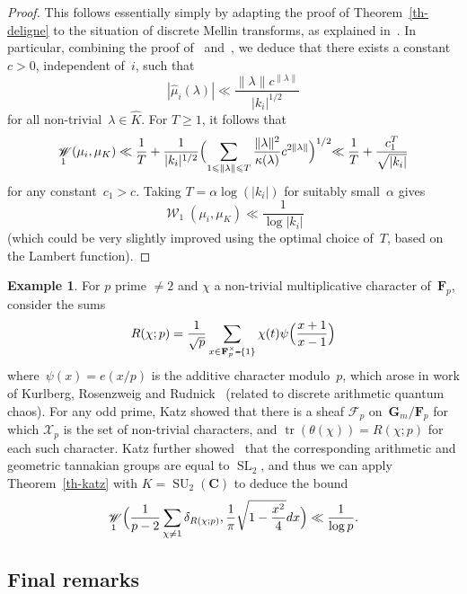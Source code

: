 \documentclass[12pt]{amsart}
\renewcommand{\mathcal}{\mathscr}
\def\setminus{\mathchoice
	{\mathbin{\vrule height .62ex width 1.61ex depth -.38ex}}%
	{\mathbin{\vrule height .62ex width 1.61ex depth -.38ex}}%
	{\mathbin{\vrule height .50ex width 0.85ex depth -.28ex}}%
	{\mathbin{\vrule height .20ex width 0.570ex depth -.24ex}}%
}
\renewcommand{\leq}{\leqslant}
\renewcommand{\geq}{\geqslant}
\newcommand{\Cc}{\mathbf{C}}
\newcommand{\Gg}{\mathbf{G}}
\newcommand{\Ff}{\mathbf{F}}
\DeclareMathOperator{\wass}{\mathcal{W}}
\DeclareMathOperator{\Tr}{tr}
\DeclareMathOperator{\SL}{SL}
\DeclareMathOperator{\SU}{SU}
\theoremstyle{plain}
\theoremstyle{remark}
\theoremstyle{definition}
\newtheorem{example}[theorem]{Example}
\renewcommand{\geq}{\geqslant}
\renewcommand{\leq}{\leqslant}
\begin{document}
\begin{proof}
  This follows essentially simply by adapting the proof of
  Theorem~\ref{th-deligne} to the situation of discrete Mellin
  transforms, as explained in~\cite[Ch.\,28]{mellin}. In particular,
  combining the proof of~\cite[Th.\,28.1]{mellin}
  and~\cite[Prop.\,6.36]{sffk}, we deduce that there exists a
  constant~$c>0$, independent of~$i$, such that
  \[
    |\widehat{\mu}_i(\lambda)|\ll
    \frac{\|\lambda\|c^{\|\lambda\|}}{|k_i|^{1/2}}
  \]
  for all non-trivial~$\lambda\in\widehat{K}$. For $T\geq 1$, it
  follows that
  \[
    \wass_1(\mu_i,\mu_K)\ll \frac{1}{T}+ \frac{1}{|k_i|^{1/2}}\Bigl(
    \sum_{1\leq \|\lambda\|\leq
      T}\frac{\|\lambda\|^2}{\kappa(\lambda)}c^{2\|\lambda\|}\Bigl)^{1/2}
    \ll \frac{1}{T}+\frac{c_1^{T}}{\sqrt{|k_i|}}
  \]
  for any constant~$c_1>c$. Taking $T=\alpha\log(|k_i|)$ for suitably
  small~$\alpha$ gives
  \[
    \wass_1(\mu_i,\mu_K)\ll \frac{1}{\log|k_i|}
  \]
  (which could be very slightly improved using the optimal choice
  of~$T$, based on the Lambert function).
\end{proof}


\begin{example}
  For $p$ prime $\not=2$ and $\chi$ a non-trivial multiplicative
  character of~$\Ff_p$, consider the sums
  \[
    R(\chi;p)=\frac{1}{\sqrt{p}}\sum_{x\in
      \Ff_p^{\times}\setminus\{1\}}
    \chi(t)\psi\Bigl(\frac{x+1}{x-1}\Bigr)
  \]
  where~$\psi(x)=e(x/p)$ is the additive character modulo~$p$, which
  arose in work of Kurlberg, Rosenzweig and Rudnick~\cite{krr}
  (related to discrete arithmetic quantum chaos). For any odd prime,
  Katz showed that there is a sheaf $\mathcal{F}_p$ on~$\Gg_m/\Ff_p$
  for which $\mathcal{X}_p$ is the set of non-trivial characters, and
  $\Tr(\theta(\chi))=R(\chi;p)$ for each such character. Katz further
  showed~\cite[Th.\,14.5]{mellin} that the corresponding arithmetic
  and geometric tannakian groups are equal to $\SL_2$, and thus we can
  apply Theorem~\ref{th-katz} with $K=\SU_2(\Cc)$ to deduce the bound
  \[
    \wass_1\Bigl(\frac{1}{p-2}\sum_{\chi\not=1}
    \delta_{R(\chi;p)},\frac{1}{\pi}\sqrt{1-\frac{x^2}{4}}dx\Bigr) \ll
    \frac{1}{\log p}.
  \]
\end{example}


\subsection{Final remarks}
\end{document}
